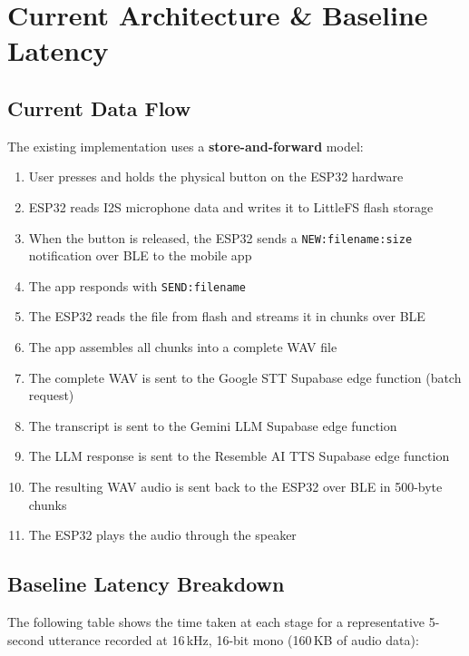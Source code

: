 \documentclass[12pt,a4paper]{article}
\begin{document}
\section{Current Architecture \& Baseline Latency}

\subsection{Current Data Flow}

The existing implementation uses a \textbf{store-and-forward} model:

\begin{enumerate}
  \item User presses and holds the physical button on the ESP32 hardware
  \item ESP32 reads I2S microphone data and writes it to LittleFS flash storage
  \item When the button is released, the ESP32 sends a \texttt{NEW:filename:size} notification
        over BLE to the mobile app
  \item The app responds with \texttt{SEND:filename}
  \item The ESP32 reads the file from flash and streams it in chunks over BLE
  \item The app assembles all chunks into a complete WAV file
  \item The complete WAV is sent to the Google STT Supabase edge function (batch request)
  \item The transcript is sent to the Gemini LLM Supabase edge function
  \item The LLM response is sent to the Resemble AI TTS Supabase edge function
  \item The resulting WAV audio is sent back to the ESP32 over BLE in 500-byte chunks
  \item The ESP32 plays the audio through the speaker
\end{enumerate}

\subsection{Baseline Latency Breakdown}

The following table shows the time taken at each stage for a representative 5-second utterance
recorded at 16\,kHz, 16-bit mono (160\,KB of audio data):
\end{document}
